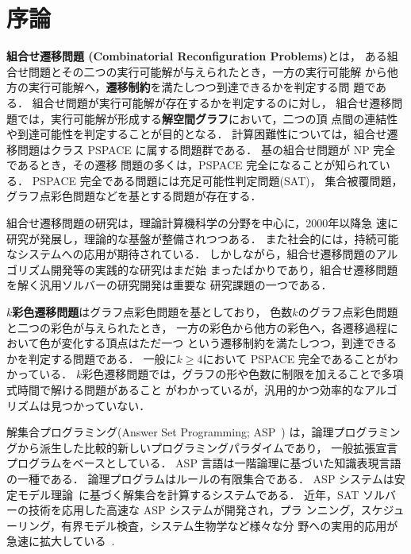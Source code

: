 \chapter{序論} \label{chap:introduction}


\textbf{組合せ遷移問題 (Combinatorial Reconfiguration Problems)}とは，
ある組合せ問題とその二つの実行可能解が与えられたとき，一方の実行可能解
から他方の実行可能解へ，\textbf{遷移制約}を満たしつつ到達できるかを判定する問
題である．
組合せ問題が実行可能解が存在するかを判定するのに対し，
組合せ遷移問題では，実行可能解が形成する\textbf{解空間グラフ}において，二つの頂
点間の連結性や到達可能性を判定することが目的となる．
計算困難性については，組合せ遷移問題はクラス PSPACE に属する問題群である．
基の組合せ問題が NP 完全であるとき，その遷移
問題の多くは，PSPACE 完全になることが知られている．
PSPACE 完全である問題には充足可能性判定問題(SAT)，
集合被覆問題，グラフ点彩色問題などを基とする問題が存在する．

組合せ遷移問題の研究は，理論計算機科学の分野を中心に，2000年以降急
速に研究が発展し，理論的な基盤が整備されつつある．
また社会的には，持続可能なシステムへの応用が期待されている．
しかしながら，組合せ遷移問題のアルゴリズム開発等の実践的な研究はまだ始
まったばかりであり，組合せ遷移問題を解く汎用ソルバーの研究開発は重要な
研究課題の一つである．

\textbf{$k$彩色遷移問題}はグラフ点彩色問題を基としており，
色数$k$のグラフ点彩色問題と二つの彩色が与えられたとき，
一方の彩色から他方の彩色へ，各遷移過程において色が変化する頂点はただ一つ
という遷移制約を満たしつつ，到達できるかを判定する問題である．
一般に$k \ge 4$において PSPACE 完全であることがわかっている．
$k$彩色遷移問題では，グラフの形や色数に制限を加えることで多項式時間で解ける問題があること
がわかっているが，汎用的かつ効率的なアルゴリズムは見つかっていない．

解集合プログラミング(Answer Set Programming; ASP~\cite{%
Baral03:cambridge,%
Gelfond88:iclp,%
Inoue08:jssst,%
Niemela99:amai})
は，論理プログラミングから派生した比較的新しいプログラミングパラダイムであり，
一般拡張宣言プログラムをベースとしている．
ASP 言語は一階論理に基づいた知識表現言語の一種である．
論理プログラムはルールの有限集合である．
ASP システムは安定モデル理論~\cite{Gelfond88:iclp}に基づく解集合を計算するシステムである．
近年，SAT ソルバーの技術を応用した高速な ASP システムが開発され，プラ
ンニング，スケジューリング，有界モデル検査，システム生物学など様々な分
野への実用的応用が急速に拡大している~\cite{Erdem16:AI}.


